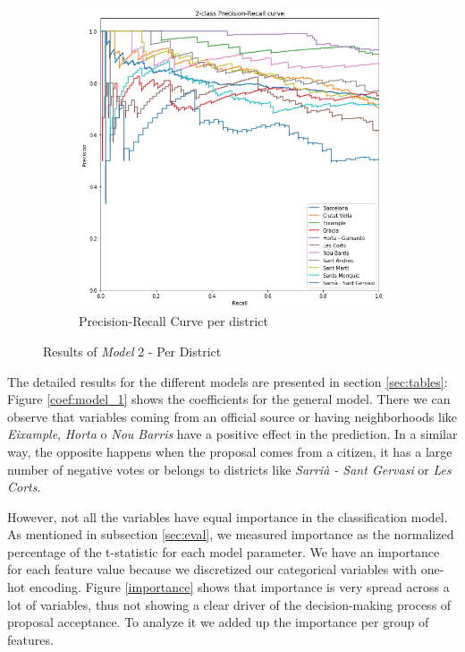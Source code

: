 \begin{figure}[t]
\begin{subfigure}{0.5\textwidth}
        \includegraphics[width=\textwidth]{Figures/PR_barri.png}
        \caption{Precision-Recall Curve per district}
    \end{subfigure}
    \caption{Results of \emph{Model} 2 - Per District}
    \label{ROC:per_dist}
\end{figure}

The detailed results for the different models are presented in section \ref{sec:tables}: Figure \ref{coef:model_1} shows the coefficients for the general model. There we can observe that variables coming from an official source or having neighborhoods like \emph{Eixample}, \emph{Horta} o \emph{Nou Barris} have a positive effect in the prediction. In a similar way, the opposite happens when the proposal comes from a citizen, it has a large number of negative votes or belongs to districts like \emph{Sarri\`a - Sant Gervasi} or \emph{Les Corts}. 

However, not all the variables have equal importance in the classification model. As mentioned in subsection \ref{sec:eval}, we measured importance as the normalized percentage of the t-statistic for each model parameter. We have an importance for each feature value because we discretized our categorical variables with one-hot encoding. Figure \ref{importance} shows that importance is very spread across a lot of variables, thus not showing a clear driver of the decision-making process of proposal acceptance. To analyze it we added up the importance per group of features. 

